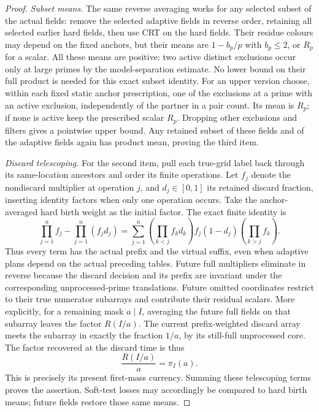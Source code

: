 \begin{proof}
\emph{Subset means.}\quad
The same reverse averaging works for any selected subset of
the actual fields: remove the selected adaptive fields in
reverse order, retaining all selected earlier hard fields,
then use CRT on the hard fields.  Their residue colours may
depend on the fixed anchors, but their means are $1-b_p/p$
with $b_p\le2$, or $R_p$ for a scalar.  All these means are
positive: two active distinct exclusions occur only at large
primes by the model-separation estimate.  No lower bound on
their full product is needed for this exact subset identity.
For an upper version choose, within each fixed static
anchor prescription, one of the exclusions at a prime with an
active exclusion, independently of the partner in a pair
count.  Its mean is $R_p$; if none is active keep the prescribed
scalar $R_p$.  Dropping other exclusions and filters gives a
pointwise upper bound.  Any retained subset of these fields and
of the adaptive fields again has product mean, proving the
third item.

\emph{Discard telescoping.}\quad
For the second item, pull each true-grid label back through
its same-location ancestors and order its finite operations.
Let $f_j$ denote the nondiscard multiplier at operation $j$,
and $d_j\in[0,1]$ its retained discard fraction, inserting
identity factors when only one operation occurs.  Take the
anchor-averaged hard birth weight as the initial factor.
The exact finite identity is
\[
 \prod_{j=1}^n f_j-\prod_{j=1}^n(f_jd_j)
 =\sum_{j=1}^n
    \left(\prod_{k<j}f_kd_k\right)f_j(1-d_j)
    \left(\prod_{k>j}f_k\right).
\]
Thus every term has the actual prefix and the virtual suffix,
even when adaptive plans depend on the actual preceding
tables.  Future full multipliers eliminate in
reverse because the discard decision and its prefix are
invariant under the corresponding unprocessed-prime
translations.  Future omitted coordinates restrict to their
true numerator subarrays and contribute their residual
scalars.  More explicitly, for a remaining mask $a\mid I$,
averaging the future full fields on that subarray leaves the
factor $R(I/a)$.  The current prefix-weighted discard array
meets the subarray in exactly the fraction $1/a$, by its
still-full unprocessed core.  The factor recovered at the
discard time is thus
\begin{equation}
 \frac{R(I/a)}a=\pi_I(a).
 \label{tab:discard-currency}
\end{equation}
This is precisely its present first-mass currency.  Summing
these telescoping terms proves the assertion.  Soft-test losses
may accordingly be compared to hard birth means; future fields
restore those same means.


\end{proof}
